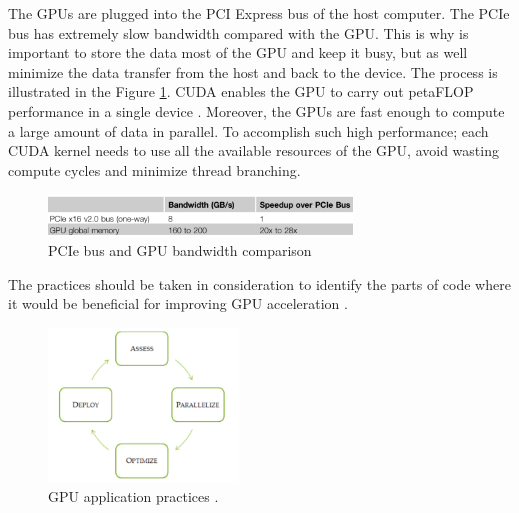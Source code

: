 The GPUs are plugged into the PCI Express bus of the host computer. The PCIe bus has extremely slow bandwidth compared with the GPU. This is why is important to store the data most of the GPU and keep it busy, but as well minimize the data transfer from the host and back to the device. The process is illustrated in the Figure \ref{fig:PCI}. CUDA enables the GPU to carry out petaFLOP performance in a single device \cite{cook}. Moreover, the GPUs are fast enough to compute a large amount of data in parallel. To accomplish such high performance; each CUDA kernel needs to use all the available resources of the GPU, avoid wasting compute cycles and minimize thread branching.

\begin{figure}[htbp]
	\centering
		\includegraphics[width=0.72\textwidth]{Figures/PCI.png}
		\smallskip
	\caption[PCIe Bandwidth]{PCIe bus and GPU bandwidth comparison \cite{cook}}
	\label{fig:PCI}
\end{figure}

The practices should be taken in consideration to identify the parts of code where it would be beneficial for improving GPU acceleration \cite{practices}.

\begin{figure}[htbp]
	\centering
		\includegraphics[width=0.45\textwidth]{Figures/apod.png}
		\smallskip
	\caption[GPU application practices]{GPU application practices \cite{practices}.}
	\label{fig:apod}
\end{figure}

